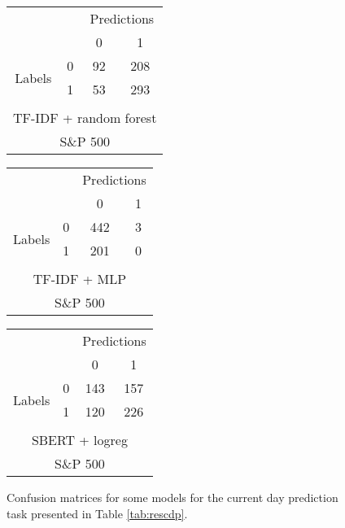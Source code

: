 \begin{figure}[!htb]
    \centering
    \begin{tabular}{cccc}
     & & \multicolumn{2}{c}{Predictions} \\
     & & \multicolumn{1}{|c|}{0} & \multicolumn{1}{c|}{1}\\
      \cline{2-4}
     \multirow{2}{*}{Labels} & 0 & \multicolumn{1}{|c|}{92} &  \multicolumn{1}{c|}{208} \\
      & 1 & \multicolumn{1}{|c|}{53} & \multicolumn{1}{c|}{293} \\ 
      \\ \multicolumn{4}{c}{TF-IDF + random forest} \\ \multicolumn{4}{c}{S\&P 500}
\end{tabular} \hspace{1em}
\begin{tabular}{cccc}
     & & \multicolumn{2}{c}{Predictions} \\
     & & \multicolumn{1}{|c|}{0} & \multicolumn{1}{c|}{1}\\
      \cline{2-4}
     \multirow{2}{*}{Labels} & 0 & \multicolumn{1}{|c|}{442} &  \multicolumn{1}{c|}{3} \\
      & 1 & \multicolumn{1}{|c|}{201} & \multicolumn{1}{c|}{0} \\ 
      \\ \multicolumn{4}{c}{TF-IDF + MLP}
      \\ \multicolumn{4}{c}{S\&P 500}
\end{tabular} \hspace{1em}
\begin{tabular}{cccc}
     & & \multicolumn{2}{c}{Predictions} \\
     & & \multicolumn{1}{|c|}{0} & \multicolumn{1}{c|}{1}\\
      \cline{2-4}
     \multirow{2}{*}{Labels} & 0 & \multicolumn{1}{|c|}{143} &  \multicolumn{1}{c|}{157} \\
      & 1 & \multicolumn{1}{|c|}{120} & \multicolumn{1}{c|}{226} \\ 
      \\ \multicolumn{4}{c}{SBERT + logreg}
      \\ \multicolumn{4}{c}{S\&P 500}
\end{tabular}
    \caption{Confusion matrices for some models for the current day prediction task presented in Table \ref{tab:rescdp}.}
    \label{tab:confmat_cdp}
\end{figure}

